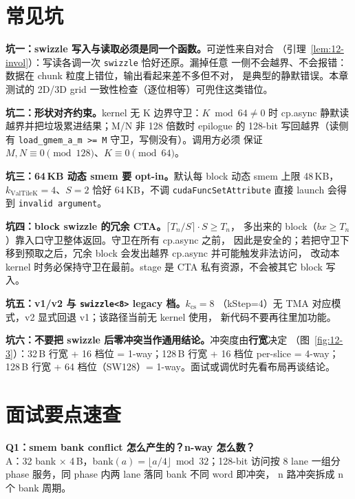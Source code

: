 \section{常见坑}

\textbf{坑一：swizzle 写入与读取必须是同一个函数。}可逆性来自对合
（引理~\ref{lem:12-invol}）：写读各调一次 \texttt{swizzle} 恰好还原。漏掉任意
一侧不会越界、不会报错：数据在 chunk 粒度上错位，输出看起来差不多但不对，
是典型的静默错误。本章测试的 2D/3D grid 一致性检查（逐位相等）可兜住这类错位。

\textbf{坑二：形状对齐约束。}\allowbreak{}kernel 无 K 边界守卫：$K\bmod 64\neq0$ 时
cp.async 静默读越界并把垃圾累进结果；M/N 非 128 倍数时 epilogue 的 128-bit
写回越界（读侧有 \texttt{load\_\allowbreak{}gmem\_\allowbreak{}a\_\allowbreak{}m >=\allowbreak{} M} 守卫，写侧没有）。调用方必须
保证 $M,N\equiv0\pmod{128}$、$K\equiv0\pmod{64}$。

\textbf{坑三：64\,KB 动态 smem 要 opt-in。}默认每 block 动态 smem 上限 48\,KB，
$k_{\mathrm{ValTileK}}{=}4$、$S{=}2$ 恰好 64\,KB，不调
\texttt{cuda\allowbreak{}Func\allowbreak{}Set\allowbreak{}Attribute} 直接 launch 会得到 \texttt{invalid argument}。

\textbf{坑四：block swizzle 的冗余 CTA。}$\lceil T_n/S\rceil\cdot S\ge T_n$，
多出来的 block（$bx\ge T_n$）靠入口守卫整体返回。守卫在所有 cp.async 之前，
因此是安全的；若把守卫下移到预取之后，冗余 block 会发出越界 cp.async 并可能触发非法访问，
改动本 kernel 时务必保持守卫在最前。stage 是 CTA 私有资源，不会被其它 block 写入。

\textbf{坑五：v1/v2 与 \texttt{swizzle<8>} legacy 档。}$k_{\mathrm{cs}}{=}8$
（kStep=4）无 TMA 对应模式，v2 显式回退 v1；该路径当前无 kernel 使用，
新代码不要再往里加功能。

\textbf{坑六：不要把 swizzle 后零冲突当作通用结论。}冲突度由\textbf{行宽}决定
（图~\ref{fig:12-3}）：32\,B 行宽 + 16 档位 = 1-way；128\,B 行宽 + 16 档位 per-slice =
4-way；128\,B 行宽 + 64 档位（SW128）= 1-way。面试或调优时先看布局再谈结论。

\section{面试要点速查}

\textbf{Q1：smem bank conflict 怎么产生的？n-way 怎么数？}\\
A：32 bank $\times$ 4\,B，bank$(a)=\lfloor a/4\rfloor\bmod32$；128-bit 访问按
8 lane 一组分 phase 服务，同 phase 内两 lane 落同 bank 不同 word 即冲突，
n 路冲突拆成 n 个 bank 周期。

